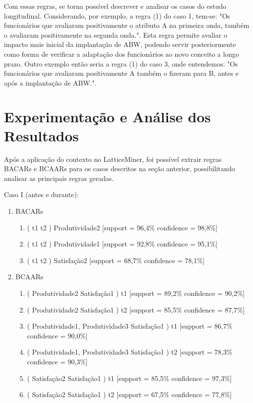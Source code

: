 \documentclass[kdmile,a4paper]{kdmile} %
\begin{document}
Com essas regras, se torna possível descrever e analisar os casos do estudo longitudinal. Considerando, por exemplo, a regra (1) do caso 1, tem-se: "Os funcionários que avaliaram positivamente o atributo A na primeira onda, também o avaliaram positivamente na segunda onda.". Esta regra permite avaliar o impacto mais inicial da implantação de ABW, podendo servir posteriormente como forma de verificar a adaptação dos funcionários ao novo conceito a longo prazo. Outro exemplo então seria a regra (1) do caso 3, onde entendemos: "Os funcionários que avaliaram positivamente A também o fizeram para B, antes e após a implantação de ABW.".

\section{Experimentação e Análise dos Resultados}

Após a aplicação do contexto no LatticeMiner, foi possível extrair regras BACARs e BCAARs para os casos descritos na seção anterior, possibilitando analisar as principais regras geradas.

Caso I (antes e durante):
\begin{enumerate}
   \item BACARs
   \begin{enumerate}
     \footnotesize \item ( t1 \textrightarrow{} t2 ) Produtividade2 [support = 96,4\% confidence = 98,8\%]
     \item ( t1 \textrightarrow{} t2 ) Produtividade1 [support = 92,8\% confidence = 95,1\%]
     \item ( t1 \textrightarrow{} t2 ) Satisfação2 [support = 68,7\% confidence = 78,1\%]
   \end{enumerate}
   \item BCAARs
   \begin{enumerate}
       \footnotesize \item ( Produtividade2 \textrightarrow{} Satisfação1 ) t1 [support = 89,2\% confidence = 90,2\%]
       \item ( Produtividade2 \textrightarrow{} Satisfação1 ) t2 [support = 85,5\% confidence = 87,7\%]
       \item ( Produtividade1, Produtividade3 \textrightarrow{} Satisfação1 ) t1 [support = 86,7\% confidence = 90,0\%]
       \item ( Produtividade1, Produtividade3 \textrightarrow{} Satisfação1 ) t2 [support = 78,3\% confidence = 90,3\%]
       \item ( Satisfação2 \textrightarrow{} Satisfação1 ) t1 [support = 85,5\% confidence = 97,3\%]
       \item ( Satisfação2 \textrightarrow{} Satisfação1 ) t2 [support = 67,5\% confidence = 77,8\%]
   \end{enumerate}
 \end{enumerate}
\end{document}
